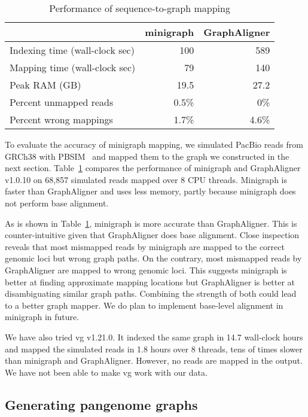 \documentclass[twocolumn]{bmcart}%
\begin{document}
\begin{table}[b]
\caption{Performance of sequence-to-graph mapping}\label{tab:mgvga}
\begin{tabular}{lrr}
\hline
& minigraph & GraphAligner \\
\hline
Indexing time (wall-clock sec) & 100 & 589 \\
Mapping time (wall-clock sec) & 79 & 140 \\
Peak RAM (GB)          & 19.5 & 27.2 \\
Percent unmapped reads & 0.5\% & 0\% \\
Percent wrong mappings & 1.7\% & 4.6\% \\
\hline
\end{tabular}
\end{table}

To evaluate the accuracy of minigraph mapping, we simulated PacBio reads from
GRCh38 with PBSIM~\cite{Ono:2013aa} and mapped them to the graph we constructed
in the next section. Table~\ref{tab:mgvga} compares the performance of
minigraph and GraphAligner~\cite{Rautiainen810812} v1.0.10 on 68,857 simulated
reads mapped over 8 CPU threads. Minigraph is faster than GraphAligner and uses
less memory, partly because minigraph does not perform base alignment.

As is shown in Table~\ref{tab:mgvga}, minigraph is more accurate than
GraphAligner. This is counter-intuitive given that GraphAligner does base
alignment. Close inspection reveals that most mismapped reads by minigraph are
mapped to the correct genomic loci but wrong graph paths. On the contrary, most
mismapped reads by GraphAligner are mapped to wrong genomic loci. This suggests
minigraph is better at finding approximate mapping locations but GraphAligner
is better at disambiguating similar graph paths.  Combining the strength of
both could lead to a better graph mapper. We do plan to implement base-level
alignment in minigraph in future.

We have also tried vg v1.21.0. It indexed the same graph in 14.7 wall-clock
hours and mapped the simulated reads in 1.8 hours over 8 threads, tens of times
slower than minigraph and GraphAligner. However, no reads are mapped in the
output. We have not been able to make vg work with our data.

\subsection*{Generating pangenome graphs}
\end{document}
